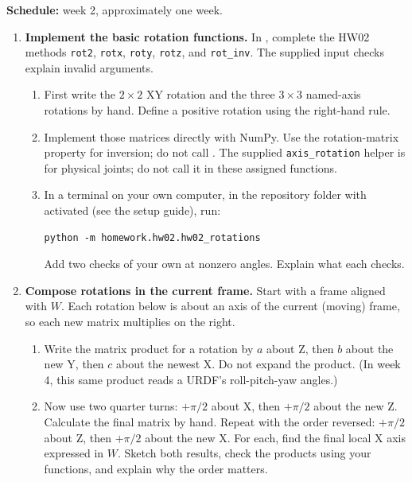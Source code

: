 

\textbf{Schedule:} week 2, approximately one week. \conventions

\begin{enumerate}
\item \textbf{Implement the basic rotation functions.}
In , complete the HW02 methods
\texttt{rot2}, \texttt{rotx}, \texttt{roty}, \texttt{rotz}, and
\texttt{rot\_inv}. The supplied input checks explain invalid arguments.
\begin{enumerate}
\item First write the $2\times2$ XY rotation and the three $3\times3$
named-axis rotations by hand. Define a positive rotation using the right-hand rule.
\item Implement those matrices directly with NumPy. Use the rotation-matrix
property for inversion; do not call .
The supplied \texttt{axis\_rotation} helper is for physical joints; do not
call it in these assigned functions.
\item In a terminal on your own computer, in the repository folder with
 activated (see the setup guide), run:
\begin{lstlisting}
python -m homework.hw02.hw02_rotations
\end{lstlisting}
Add two checks of your own at nonzero angles. Explain what each checks.
\end{enumerate}

\item \textbf{Compose rotations in the current frame.}
Start with a frame aligned with $W$. Each rotation below is about an axis
of the current (moving) frame, so each new matrix multiplies on the right.
\begin{enumerate}
\item Write the matrix product for a rotation by $a$ about Z, then $b$
about the new Y, then $c$ about the newest X. Do not expand the product.
(In week 4, this same product reads a URDF's roll-pitch-yaw angles.)
\item Now use two quarter turns: $+\pi/2$ about X, then $+\pi/2$ about the
new Z. Calculate the final matrix by hand. Repeat with the order reversed:
$+\pi/2$ about Z, then $+\pi/2$ about the new X. For each, find the final
local X axis expressed in $W$. Sketch both results, check the products
using your functions, and explain why the order matters.
\end{enumerate}


\end{enumerate}
